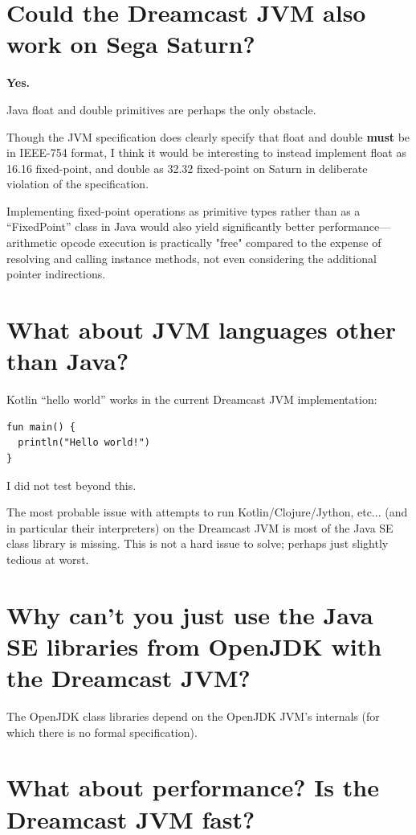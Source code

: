 \documentclass[20pt]{article}
\begin{document}
\section{Could the Dreamcast JVM also work on Sega Saturn?}

\textbf{Yes.}

Java float and double primitives are perhaps the only obstacle.

Though the JVM specification does clearly specify that float and double
\textbf{must} be in IEEE-754 format, I think it would be interesting to instead
implement float as 16.16 fixed-point, and double as 32.32 fixed-point on Saturn
in deliberate violation of the specification.

Implementing fixed-point operations as primitive types rather than as a
“FixedPoint” class in Java would also yield significantly better
performance---arithmetic opcode execution is practically "free" compared to the
expense of resolving and calling instance methods, not even considering the
additional pointer indirections.

\section{What about JVM languages other than Java?}

Kotlin “hello world” works in the current Dreamcast JVM implementation:

\begin{verbatim}
fun main() {
  println("Hello world!")
}
\end{verbatim}

I did not test beyond this.

The most probable issue with attempts to run Kotlin/Clojure/Jython, etc... (and
in particular their interpreters) on the Dreamcast JVM is most of the Java SE
class library is missing. This is not a hard issue to solve; perhaps just
slightly tedious at worst.

\section{Why can't you just use the Java SE libraries from OpenJDK with the Dreamcast JVM?}

The OpenJDK class libraries depend on the OpenJDK JVM's internals (for which
there is no formal specification).

\section{What about performance? Is the Dreamcast JVM fast?}
\end{document}
